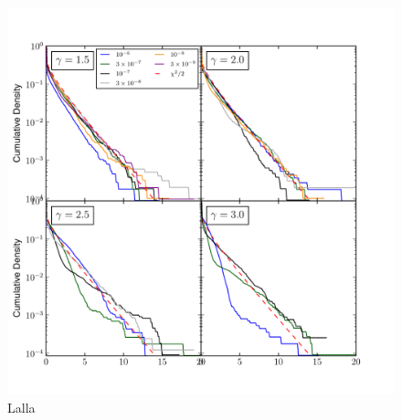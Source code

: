 \documentclass{emulateapj}
\begin{document}
\begin{figure}
  \begin{center}
    \includegraphics{mc_plots/ts_ext_emin_1000.pdf}
    \end{center}
    \caption{Lalla}\label{ts_ext}
  \end{figure}
\end{document}
